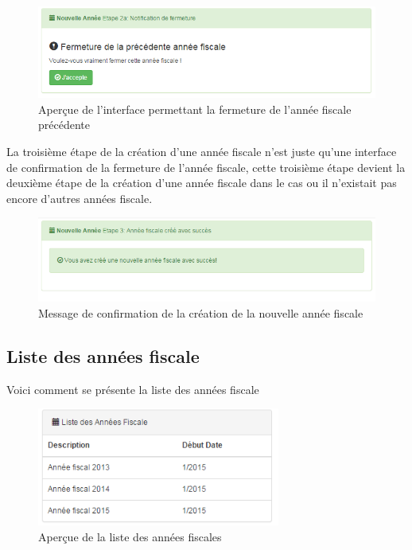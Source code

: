 \documentclass[12pt,a4paper]{report}
\begin{document}
\begin{figure}[h]
\begin{center}
\includegraphics[width=12cm]{pic/CloseFiscYear.png}
\end{center}
\caption{Aperçue de l'interface permettant la fermeture de l'année fiscale précédente}
\label{Aperçue de l'interface permettant la fermeture de l'année fiscale précédente}
\end{figure}

La troisième étape de la création d'une année fiscale n'est juste qu'une interface de confirmation de la fermeture de l'année fiscale, cette troisième étape devient la deuxième étape de la création d'une année fiscale dans le cas ou il n'existait pas encore d'autres années fiscale.

\begin{figure}[h]
\begin{center}
\includegraphics[width=12cm]{pic/ConfirSucces.png}
\end{center}
\caption{Message de confirmation de la création de la nouvelle année fiscale}
\label{Message de confirmation de la création de la nouvelle année fiscale}
\end{figure}

\newpage

\subsection{Liste des années fiscale}
Voici comment se présente la liste des années fiscale

\begin{figure}[h]
\begin{center}
\includegraphics[width=8cm]{pic/ListeAnnFisc.png}
\end{center}
\caption{Aperçue de la liste des années fiscales}
\label{Aperçue de la liste des années fiscaux}
\end{figure}
\end{document}
